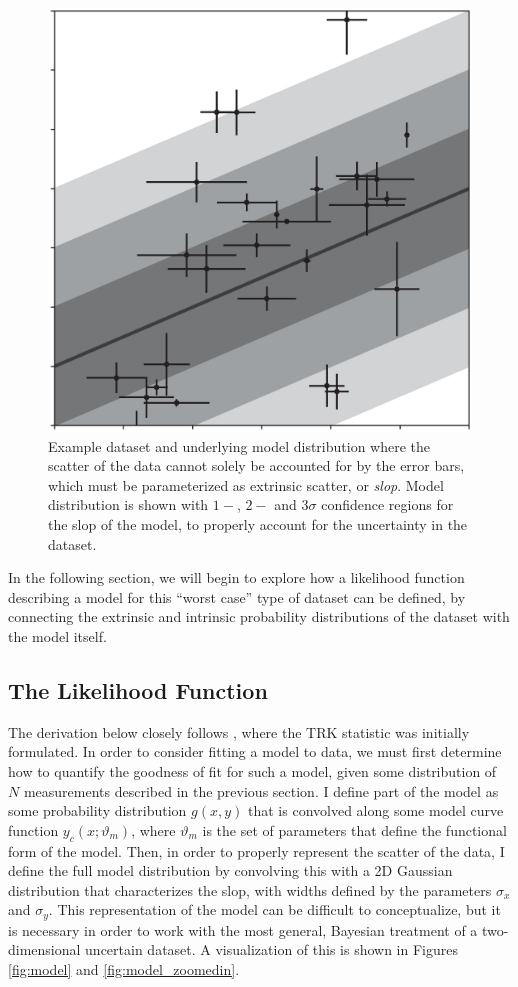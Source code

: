 \begin{figure}
    \centering
    \includegraphics[width=0.8\linewidth]{figures/slopexample.eps}
    \caption{Example dataset and underlying model distribution where the scatter of the data cannot solely be accounted for by the error bars, which must be parameterized as extrinsic scatter, or \textit{slop}. Model distribution is shown with $1-$, $2-$ and $3\sigma$ confidence regions for the slop of the model, to properly account for the uncertainty in the dataset.}
    \label{fig:slopexample}
\end{figure}

In the following section, we will begin to explore how a likelihood function describing a model for this ``worst case'' type of dataset can be defined, by connecting the extrinsic and intrinsic probability distributions of the dataset with the model itself.

\subsection{The Likelihood Function}
The derivation below closely follows \textcite{trotter}, where the TRK statistic was initially formulated. In order to consider fitting a model to data, we must first determine how to quantify the goodness of fit for such a model, given some distribution of $N$ measurements described in the previous section. I define part of the model as some probability distribution $g(x,y)$ that is convolved along some model curve function $y_c(x;\vartheta_m)$, where $\vartheta_m$ is the set of parameters that define the functional form of the model. Then, in order to properly represent the scatter of the data, I define the full model distribution by convolving this with a 2D Gaussian distribution that characterizes the slop, with widths defined by the parameters $\sigma_x$ and $\sigma_y$. This representation of the model can be difficult to conceptualize, but it is necessary in order to work with the most general, Bayesian treatment of a two-dimensional uncertain dataset. A visualization of this is shown in Figures \ref{fig:model} and \ref{fig:model_zoomedin}.

